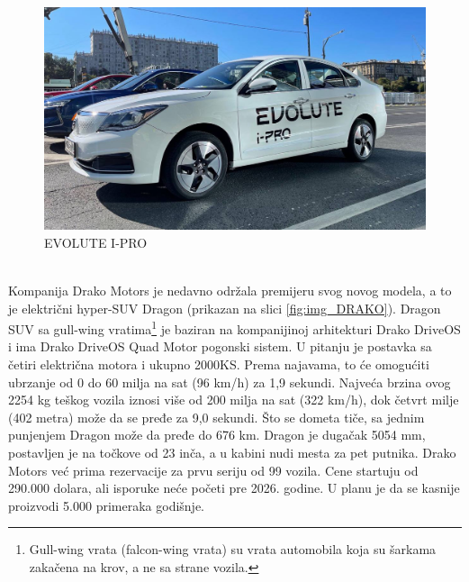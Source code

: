 \documentclass[a4paper]{article}
\begin{document}
    \newpage
    
    \begin{figure}[h]
        \centering
        \includegraphics[width=\linewidth]{evoluteipro.jpg}
        \caption{EVOLUTE I-PRO}
        \label{fig:IMG_EVOLUTE}
        \end{figure}


\\

    Kompanija Drako Motors je nedavno održala premijeru svog novog modela, a to je električni hyper-SUV Dragon (prikazan na slici \ref{fig:img_DRAKO}). 
    Dragon SUV sa gull-wing vratima\footnote{Gull-wing vrata (falcon-wing vrata) su vrata automobila koja su šarkama zakačena na krov, a ne sa strane vozila.} je baziran na kompanijinoj arhitekturi Drako DriveOS i ima Drako DriveOS Quad Motor pogonski sistem. U pitanju je postavka sa četiri električna motora i ukupno 2000KS. Prema najavama, to će omogućiti ubrzanje od 0 do 60 milja na sat (96 km/h) za 1,9 sekundi.
    Najveća brzina ovog 2254 kg teškog vozila iznosi više od 200 milja na sat (322 km/h), dok četvrt milje (402 metra) može da se pređe za 9,0 sekundi. Što se dometa tiče, sa jednim punjenjem Dragon može da pređe do 676 km. Dragon je dugačak 5054 mm, postavljen je na točkove od 23 inča, a u kabini nudi mesta za pet putnika.
    Drako Motors već prima rezervacije za prvu seriju od 99 vozila. Cene startuju od 290.000 dolara, ali isporuke neće početi pre 2026. godine. U planu je da se kasnije proizvodi 5.000 primeraka godišnje.
 
\end{document}
